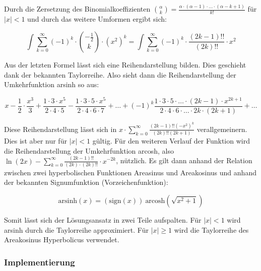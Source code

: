 \documentclass[course=erap]{aspdoc}
\begin{document}
    Durch die Zersetzung des Binomialkoeffizienten $\binom{\alpha}{k} = \frac{\alpha \cdot (\alpha-1) \cdot \ldots \cdot (\alpha-k+1)}{k!}$ für $|x| < 1$ und durch das weitere Umformen ergibt sich:
    
    \begin{equation}
        \int \sum_{k=0}^{\infty} (-1)^k \cdot \binom{-\frac{1}{2}}{k} \cdot (x^2)^k = \int \sum_{k=0}^{\infty} (-1)^k \cdot \frac{(2k-1)!!}{(2k)!!} \cdot x^2
    \end{equation}
    
    Aus der letzten Formel lässt sich eine Reihendarstellung bilden. Dies geschieht dank der bekannten Taylorreihe. Also sieht dann die Reihendarstellung der Umkehrfunktion arsinh so aus:
    
    \begin{equation}\label{reihe}
        x - \frac{1}{2} \cdot \frac{x^3}{3} + \frac{1 \cdot 3 \cdot x^5}{2 \cdot 4 \cdot 5} - \frac{1 \cdot 3 \cdot 5 \cdot x^5}{2 \cdot 4 \cdot 6 \cdot 7} + \ldots + (-1)^k \frac{1 \cdot 3 \cdot 5 \cdot \ldots \cdot (2k -1) \cdot x^{2k + 1}}{2 \cdot 4 \cdot 6 \cdot \ldots \cdot 2k \cdot (2k + 1)} + \dots
    \end{equation}
    
    Diese Reihendarstellung lässt sich in $x \cdot \sum_{k=0}^{\infty} \frac{(2k - 1)!!(-x^2)^k}{(2k)!!(2k+1)}$ verallgemeinern. Dies ist aber nur für $|x| < 1$ gültig. Für den weiteren Verlauf der Funktion wird die Reihendarstellung der Umkehrfunktion arcosh, also $\ln(2x) - \sum_{k=0}^{\infty} \frac{(2k - 1)!!}{(2k) \cdot (2k)!!} \cdot x^{-2k}$, nützlich. Es gilt dann anhand der Relation zwischen zwei hyperbolischen Funktionen Areasinus und Areakosinus \cite{bronshtein2015algebra} und anhand der bekannten Signumfunktion (Vorzeichenfunktion):
    
    \begin{equation}
        \text{arsinh}(x) = (\text{sign}(x)) \ \text{arcosh}(\sqrt{x^2 + 1})
    \end{equation}
 
    Somit lässt sich der Lösungsansatz in zwei Teile aufspalten. Für $|x|<1$ wird arsinh durch die Taylorreihe approximiert. Für $|x|\geq1$ wird die Taylorreihe des Areakosinus Hyperbolicus verwendet. 
    
    \subsubsection{Implementierung}
    
\end{document}
